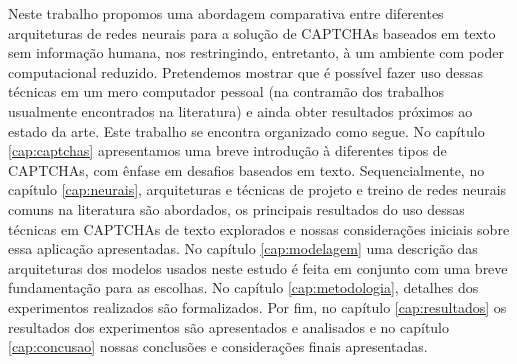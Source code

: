 Neste trabalho propomos uma abordagem comparativa entre diferentes arquiteturas de redes neurais para a solução de CAPTCHAs baseados em texto sem informação humana, nos restringindo, entretanto, à um ambiente com poder computacional reduzido. Pretendemos mostrar que é possível fazer uso dessas técnicas em um mero computador pessoal (na contramão dos trabalhos usualmente encontrados na literatura) e ainda obter resultados próximos ao estado da arte. Este trabalho se encontra organizado como segue. No capítulo \ref{cap:captchas} apresentamos uma breve introdução à diferentes tipos de CAPTCHAs, com ênfase em desafios baseados em texto. Sequencialmente, no capítulo \ref{cap:neurais}, arquiteturas e técnicas de projeto e treino de redes neurais comuns na literatura são abordados, os principais resultados do uso dessas técnicas em CAPTCHAs de texto explorados e nossas considerações iniciais sobre essa aplicação apresentadas. No capítulo \ref{cap:modelagem} uma descrição das arquiteturas dos modelos usados neste estudo é feita em conjunto com uma breve fundamentação para as escolhas. No capítulo \ref{cap:metodologia}, detalhes dos experimentos realizados são formalizados. Por fim, no capítulo \ref{cap:resultados} os resultados dos experimentos são apresentados e analisados e no capítulo \ref{cap:concusao} nossas conclusões e considerações finais apresentadas.
